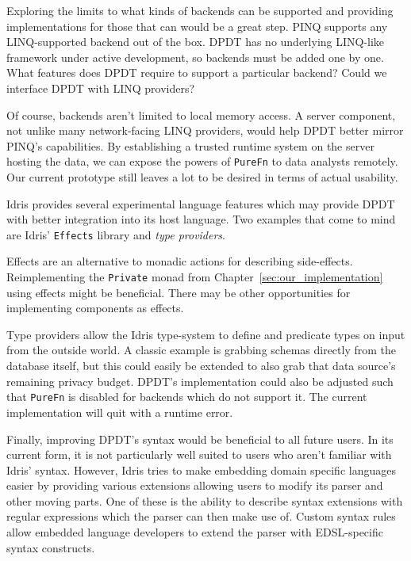 \documentclass[12pt]{article}
\begin{document}
Exploring the limits to what kinds of backends can be supported and providing implementations for those that can would be a great step.
PINQ supports any LINQ-supported backend out of the box.
DPDT has no underlying LINQ-like framework under active development, so backends must be added one by one.
What features does DPDT require to support a particular backend?
Could we interface DPDT with LINQ providers?

Of course, backends aren't limited to local memory access.
A server component, not unlike many network-facing LINQ providers, would help DPDT better mirror PINQ's capabilities.
By establishing a trusted runtime system on the server hosting the data, we can expose the powers of \texttt{PureFn} to data analysts remotely.
Our current prototype still leaves a lot to be desired in terms of actual usability.


Idris provides several experimental language features which may provide DPDT with better integration into its host language.
Two examples that come to mind are Idris' \texttt{Effects} library and \textit{type providers}.

Effects are an alternative to monadic actions for describing side-effects.
Reimplementing the \texttt{Private} monad from Chapter~\ref{sec:our_implementation} using effects might be beneficial.
There may be other opportunities for implementing components as effects.

Type providers allow the Idris type-system to define and predicate types on input from the outside world.
A classic example is grabbing schemas directly from the database itself, but this could easily be extended to also grab that data source's remaining privacy budget.
DPDT's implementation could also be adjusted such that \texttt{PureFn} is disabled for backends which do not support it.
The current implementation will quit with a runtime error.


Finally, improving DPDT's syntax would be beneficial to all future users.
In its current form, it is not particularly well suited to users who aren't familiar with Idris' syntax.
However, Idris tries to make embedding domain specific languages easier by providing various extensions allowing users to modify its parser and other moving parts.
One of these is the ability to describe syntax extensions with regular expressions which the parser can then make use of.
Custom syntax rules allow embedded language developers to extend the parser with EDSL-specific syntax constructs.
\end{document}
